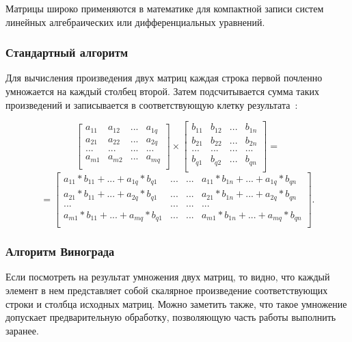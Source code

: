\documentclass[a4paper,14pt]{article}
\begin{document}
		
	Матрицы широко применяются в математике для компактной записи систем линейных алгебраических или дифференциальных уравнений.
	
	    \subsubsection{Стандартный алгоритм}
	Для вычисления произведения двух матриц каждая строка первой
почленно умножается на каждый столбец второй. Затем подсчитывается сумма таких произведений и записывается в соответствующую клетку результата~\cite{makkonell}:

\[ \begin{bmatrix}
a_{11} & a_{12} & ... & a_{1q}\\
a_{21} & a_{22} & ... & a_{2q}\\
... & ... & ... & ...\\
a_{m1} & a_{m2} & ... & a_{mq}\\
\end{bmatrix} \times 
\begin{bmatrix}
b_{11} & b_{12} & ... & b_{1n}\\
b_{21} & b_{22} & ... & b_{2n}\\
... & ... & ... & ...\\
b_{q1} & b_{q2} & ... & b_{qn}\\
\end{bmatrix} = \]
\[=\begin{bmatrix}
a_{11}*b_{11} + ... + a_{1q}*b_{q1} & ... & ... & a_{11}*b_{1n} + ... + a_{1q}*b_{qn}\\
a_{21}*b_{11} + ... + a_{2q}*b_{q1} & ... & ... & a_{21}*b_{1n} + ... + a_{2q}*b_{qn}\\
... & ... & ... & ...\\
a_{m1}*b_{11} + ... + a_{mq}*b_{q1} & ... & ... & a_{m1}*b_{1n} + ... + a_{mq}*b_{qn}\\
\end{bmatrix}. \]
		     		
		    
	  	\subsubsection{Алгоритм Винограда}
		Если посмотреть на результат умножения двух матриц, то видно,
что каждый элемент в нем представляет собой скалярное произведение
соответствующих строки и столбца исходных матриц. Можно заметить
также, что такое умножение допускает предварительную обработку,
позволяющую часть работы выполнить заранее.
	
\end{document}
